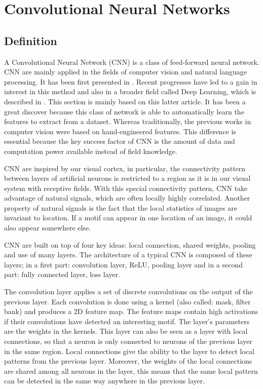 \chapter{Convolutional Neural Networks}

\label{chapter:ConvolutionalNeuralNetworks}


\section{Definition}
A Convolutional Neural Network (CNN) is a class of feed-forward neural network. CNN are mainly applied in the fields of computer vision and natural language processing. It has been first presented in \cite{lecun1998gradient}. Recent progresses have led to a gain in interest in this method and also in a broader field called Deep Learning, which is described in \cite{lecun2015deep}. This section is mainly based on this latter article. It has been a great discover because this class of network is able to automatically learn the features to extract from a dataset. Whereas traditionally, the previous works in computer vision were based on hand-engineered features. This difference is essential because the key success factor of CNN is the amount of data and computation power available instead of field knowledge.

CNN are inspired by our visual cortex, in particular, the connectivity pattern between layers of artificial neurons is restricted to a region as it is in our visual system with receptive fields. With this special connectivity pattern, CNN take advantage of natural signals, which are often locally highly correlated. Another property of natural signals is the fact that the local statistics of images are invariant to location. If a motif can appear in one location of an image, it could also appear somewhere else.

CNN are built on top of four key ideas: local connection, shared weights, pooling and use of many layers. The architecture of a typical CNN is composed of these layers; in a first part: convolution layer, ReLU, pooling layer and in a second part: fully connected layer, loss layer.

The convolution layer applies a set of discrete convolutions on the output of the previous layer. Each convolution is done using a kernel (also called: mask, filter bank) and produces a 2D feature map. The feature maps contain high activations if their convolutions have detected an interesting motif. The layer's parameters are the weights in the kernels. This layer can also be seen as a layer with local connections, so that a neuron is only connected to neurons of the previous layer in the same region. Local connections give the ability to the layer to detect local patterns from the previous layer. Moreover, the weights of the local connections are shared among all neurons in the layer, this means that the same local pattern can be detected in the same way anywhere in the previous layer.

